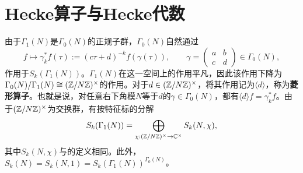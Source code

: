 \section{Hecke算子与Hecke代数}\label{L8S2}
由于$\Gamma_1(N)$是$\Gamma_0(N)$的正规子群，$\Gamma_0(N)$自然通过
\[f\longmapsto\gamma_k^*f(\tau):=(c\tau+d)^{-k}f(\gamma(\tau)),\qquad \gamma=\begin{pmatrix}a&b\\c&d\end{pmatrix}\in\Gamma_0(N),\]
作用于$S_k(\Gamma_1(N))$。$\Gamma_1(N)$在这一空间上的作用平凡，因此该作用下降为$\Gamma_0(N)/\Gamma_1(N)\cong(\mathbb{Z}/N\mathbb{Z})^\times$的作用。对于$d\in(\mathbb{Z}/N\mathbb{Z})^\times$，将其作用记为$\langle d\rangle$，称为\textbf{菱形算子}。也就是说，对任意右下角模$N$等于$d$的$\gamma\in\Gamma_0(N)$，都有$\langle d\rangle f=\gamma_k^*f$。由于$(\mathbb{Z}/N\mathbb{Z})^\times$为交换群，有按特征标的分解
\[S_k(\Gamma_1(N))=\bigoplus_{\chi:(\mathbb{Z}/N\mathbb{Z})^\times\to\mathbb{C}^\times}S_k(N,\chi),\]
其中$S_k(N,\chi)$与的定义相同。此外，$S_k(N)=S_k(N,1)=S_k(\Gamma_1(N))^{\Gamma_0(N)}$。

